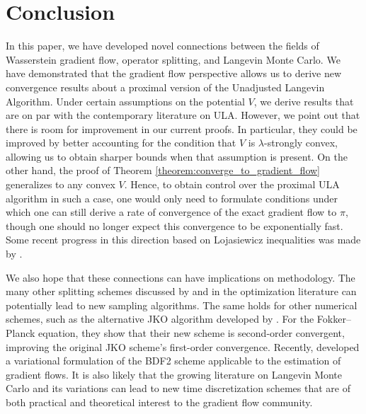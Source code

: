 \documentclass[final,12pt]{colt2018}
\begin{document}
\section{Conclusion}
In this paper, we have developed novel connections between the fields of Wasserstein gradient flow, operator splitting, and Langevin Monte Carlo. We have demonstrated that the gradient flow perspective allows us to derive new convergence results about a proximal version of the Unadjusted Langevin Algorithm. Under certain assumptions on the potential $V$, we derive results that are on par with the contemporary literature on ULA. However, we point out that there is room for improvement in our current proofs.  In particular, they could be improved by better accounting for the condition that $V$ is $\lambda$-strongly convex, allowing us to obtain sharper bounds when that assumption is present. On the other hand, the proof of Theorem \ref{theorem:converge_to_gradient_flow} generalizes to any convex $V$. Hence, to obtain control over the proximal ULA algorithm in such a case, one would only need to formulate conditions under which one can still derive a rate of convergence of the exact gradient flow to $\pi$, though one should no longer expect this convergence to be exponentially fast. Some recent progress in this direction  based on Lojasiewicz inequalities was made by \citet{blanchet2016family}.  

We also hope that these connections can have implications on methodology. The many other splitting schemes discussed by \citet{holden2010splitting} and in the optimization literature can potentially lead to new sampling algorithms. The same holds for other numerical schemes, such as the alternative JKO algorithm developed by \citet{legendre2017second}. For the Fokker--Planck equation, they show that their new scheme is second-order convergent, improving the original JKO scheme's first-order convergence. Recently, \citet{plazotta2018bdf2} developed a variational formulation of the BDF2 scheme applicable to the estimation of gradient flows. It is also likely that the growing literature on Langevin Monte Carlo and its variations can lead to new time discretization schemes that are of both practical and theoretical interest to the gradient flow community.




\end{document}
